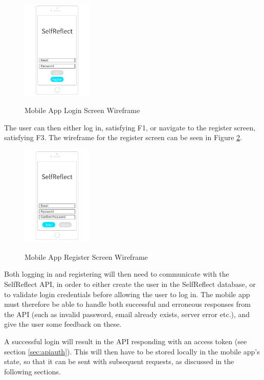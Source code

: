 \documentclass[11pt,openright,a4paper]{report}
\begin{document}
\begin{figure}[ht]
\centering
\caption{Mobile App Login Screen Wireframe}
\includegraphics[width=0.3\textwidth]{i/mobilelogin.png}
\label{fig:mobilelogin}
\end{figure}

The user can then either log in, satisfying F1, or navigate to the register screen, satisfying F3. The wireframe for the register screen can be seen in Figure \ref{fig:mobileregister}.

\begin{figure}[ht]
\centering
\caption{Mobile App Register Screen Wireframe}
\includegraphics[width=0.3\textwidth]{i/mobileregister.png}
\label{fig:mobileregister}
\end{figure}

Both logging in and registering will then need to communicate with the SelfReflect API, in order to either create the user in the SelfReflect database, or to validate login credentials before allowing the user to log in. The mobile app must therefore be able to handle both successful and erroneous responses from the API (such as invalid password, email already exists, server error etc.), and give the user some feedback on these.

A successful login will result in the API responding with an access token (see section \ref{sec:apiauth}). This will then have to be stored locally in the mobile app's state, so that it can be sent with subsequent requests, as discussed in the following sections.
\end{document}
